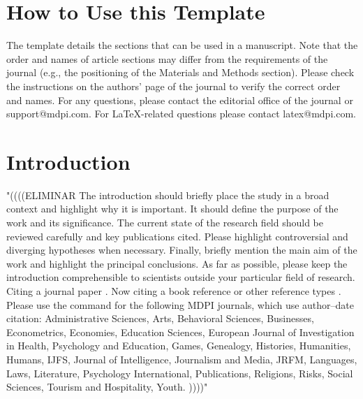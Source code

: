 \documentclass[journal,article,submit,pdftex,moreauthors]{Definitions/mdpi}
\begin{document}
\setcounter{section}{-1} %
\section{How to Use this Template}

The template details the sections that can be used in a manuscript. Note that the order and names of article sections may differ from the requirements of the journal (e.g., the positioning of the Materials and Methods section). Please check the instructions on the authors' page of the journal to verify the correct order and names. For any questions, please contact the editorial office of the journal or support@mdpi.com. For LaTeX-related questions please contact latex@mdpi.com.%


\section{Introduction}
"((((ELIMINAR
The introduction should briefly place the study in a broad context and highlight why it is important. It should define the purpose of the work and its significance. The current state of the research field should be reviewed carefully and key publications cited. Please highlight controversial and diverging hypotheses when necessary. Finally, briefly mention the main aim of the work and highlight the principal conclusions. As far as possible, please keep the introduction comprehensible to scientists outside your particular field of research. Citing a journal paper  \cite{ref-journal}.  Now citing a book reference  \cite{ref-book1,ref-book2} or other reference types  \cite{ref-unpublish,ref-url}. Please use the command  \cite{ref-proceeding,ref-thesis} for the following MDPI journals, which use author--date citation: Administrative Sciences, Arts, Behavioral Sciences, Businesses, Econometrics, Economies, Education Sciences, European Journal of Investigation in Health, Psychology and Education, Games, Genealogy, Histories, Humanities, Humans, IJFS, Journal of Intelligence, Journalism and Media, JRFM, Languages, Laws, Literature, Psychology International, Publications, Religions, Risks, Social Sciences, Tourism and Hospitality, Youth. 
))))"
\end{document}

